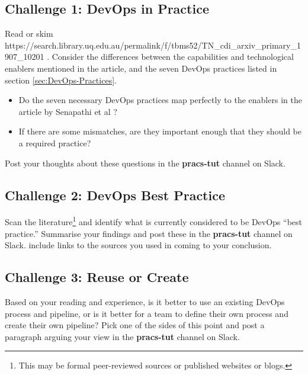 \documentclass{csse4400}
\begin{document}
\subsection*{Challenge 1: DevOps in Practice}
Read or skim 
{https://search.library.uq.edu.au/permalink/f/tbms52/TN_cdi_arxiv_primary_1907_10201}
\cite{SenapathiMali2018DCPa}.
Consider the differences between the capabilities and technological enablers mentioned in the article,
and the seven DevOps practices listed in section \ref{sec:DevOps-Practices}.
\begin{itemize}
    \item Do the seven necessary DevOps practices map perfectly to the enablers in the article by Senapathi et al \cite{SenapathiMali2018DCPa}?
    \item If there are some mismatches, are they important enough that they should be a required practice?
\end{itemize}

\noindent
Post your thoughts about these questions in the \textbf{pracs-tut} channel on Slack.

\subsection*{Challenge 2: DevOps Best Practice}
Scan the literature\footnote{This may be formal peer-reviewed sources or published websites or blogs.}
and identify what is currently considered to be DevOps ``best practice.''
Summarise your findings and post these in the \textbf{pracs-tut} channel on Slack.
include links to the sources you used in coming to your conclusion.

\subsection*{Challenge 3: Reuse or Create}
Based on your reading and experience, is it better to use an existing DevOps process and pipeline,
or is it better for a team to define their own process and create their own pipeline?
Pick one of the sides of this point and post a paragraph arguing your view in the \textbf{pracs-tut} channel on Slack.




\end{document}

